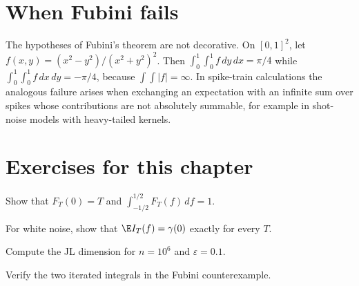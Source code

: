\section{When Fubini fails}
The hypotheses of Fubini's theorem are not decorative. On
$[0,1]^2$, let $f(x,y)=(x^2-y^2)/(x^2+y^2)^2$. Then
$\int_0^1\int_0^1f\,dy\,dx=\pi/4$ while
$\int_0^1\int_0^1f\,dx\,dy=-\pi/4$, because $\int\!\!\int|f|=\infty$. In
spike-train calculations the analogous failure arises when exchanging
an expectation with an infinite sum over spikes whose contributions are
not absolutely summable, for example in shot-noise models with heavy-tailed
kernels.

\section*{Exercises for this chapter}
\begin{exercise}
Show that $F_T(0)=T$ and $\int_{-1/2}^{1/2}F_T(f)\,df=1$.
\end{exercise}
\begin{exercise}
For white noise, show that $\E I_T(f)=\gamma(0)$ exactly for every $T$.
\end{exercise}
\begin{exercise}
Compute the JL dimension for $n=10^6$ and $\varepsilon=0.1$.
\end{exercise}
\begin{exercise}
Verify the two iterated integrals in the Fubini counterexample.
\end{exercise}
